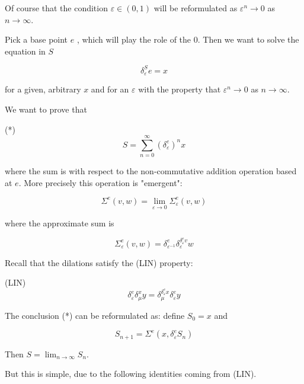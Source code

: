 \documentclass{article}
\begin{document}
Of course that the condition $\varepsilon \in (0,1)$ will be reformulated as $\varepsilon^{n} \rightarrow 0$ as $n \rightarrow \infty$. 



Pick a base point $e$ , which will play the role of the $0$. Then we want to solve the equation in $S$ 



$$ \delta^{S}_{\varepsilon} e = x$$



for a given, arbitrary $x$ and for an $\varepsilon$ with the property that $\varepsilon^{n} \rightarrow 0$ as $n \rightarrow \infty$.



We want to prove that 



(*) $$S = \sum_{n=0}^{\infty} \left( \delta^{e}_{\varepsilon}\right)^{n} x$$



where the sum is with respect to the non-commutative addition operation based at $e$. More precisely this operation is "emergent":



$$ \Sigma^{e} (v, w)  = \lim_{\varepsilon \rightarrow 0} \Sigma^{e}_{\varepsilon}(v,w)$$



where the approximate sum is 



$$ \Sigma^{e}_{\varepsilon}(v,w) = \delta^{e}_{\varepsilon^{-1}} \delta^{\delta^{e}_{\varepsilon} v}_{\varepsilon} w$$



Recall that the dilations satisfy the (LIN) property: 



(LIN) $$\delta^{e}_{\varepsilon} \delta^{x}_{\mu} y = \delta^{\delta^{e}_{\varepsilon} x}_{\mu} \delta^{e}_{\varepsilon} y$$



The conclusion (*) can be reformulated as: define $S_{0} = x$ and 



$$ S_{n+1} = \Sigma^{e}(x, \delta^{e}_{\varepsilon} S_{n})$$



Then $S =\lim_{n \rightarrow \infty} S_{n}$. 



But this is simple, due to the following identities coming from (LIN).
\end{document}
